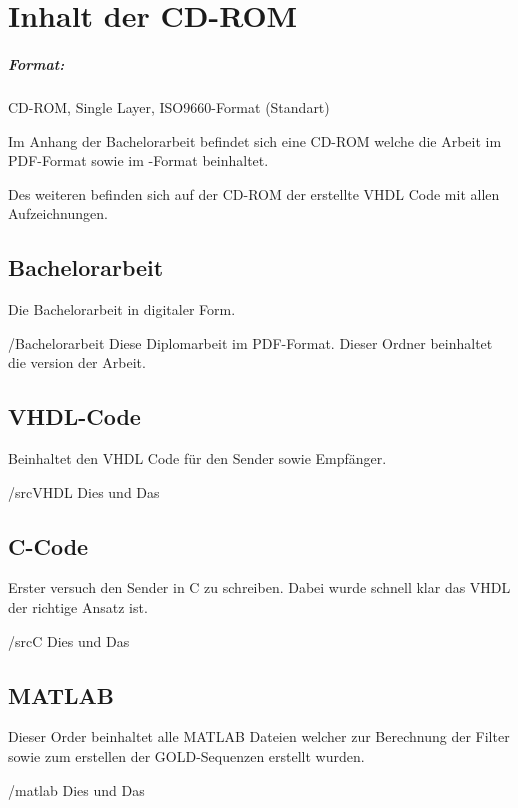 \chapter{Inhalt der CD-ROM}
\label{app:cdrom}

\paragraph{Format:} 
		CD-ROM, Single Layer, ISO9660-Format (Standart)%

Im Anhang der Bachelorarbeit befindet sich eine CD-ROM welche die Arbeit im PDF-Format sowie im \latex-Format beinhaltet.

Des weiteren befinden sich auf der CD-ROM der erstellte VHDL Code mit allen Aufzeichnungen.

\section{Bachelorarbeit}
Die Bachelorarbeit in digitaler Form.
\begin{FileList}{/Bachelorarbeit}
 Diese Diplomarbeit im PDF-Format.
 Dieser Ordner beinhaltet die \latex version der Arbeit.%
\end{FileList}

\section{VHDL-Code}
Beinhaltet den VHDL Code für den Sender sowie Empfänger.
\begin{FileList}{/srcVHDL}
 Dies und Das %
\end{FileList}

\section{C-Code}
Erster versuch den Sender in C zu schreiben.
Dabei wurde schnell klar das VHDL der richtige Ansatz ist.
\begin{FileList}{/srcC}
 Dies und Das %
\end{FileList}

\section{MATLAB}
Dieser Order beinhaltet alle MATLAB Dateien welcher zur Berechnung der Filter sowie zum erstellen der GOLD-Sequenzen erstellt wurden.
\begin{FileList}{/matlab}
 Dies und Das %
\end{FileList}


